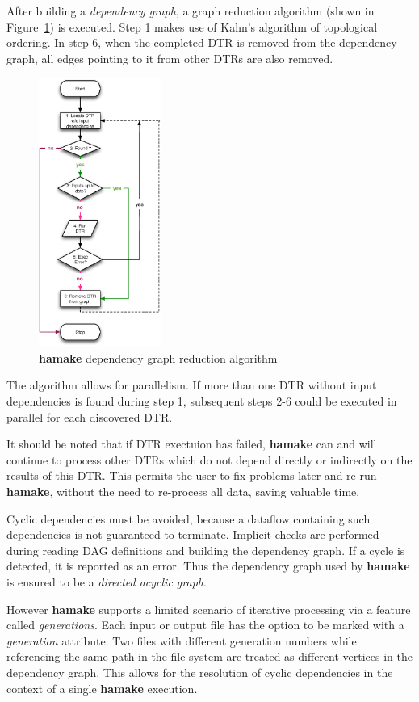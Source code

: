 \documentclass[10pt,conference,letterpaper]{IEEEtran}
\begin{document}
After building a \textit{dependency graph}, a graph reduction algorithm (shown in Figure~\ref{fig:grred}) is
executed. Step 1 makes use of Kahn's algorithm\cite{kahn1962topological} of
topological ordering. In step 6, when the completed DTR is
removed from the dependency graph, all edges pointing to it from other
DTRs are also removed.

\begin{figure}[htp]
\centering
\includegraphics[width=4cm]{GraphReduction.eps}
\caption{\textbf{hamake} dependency graph reduction algorithm}
\label{fig:grred}
\end{figure}

The algorithm allows for parallelism. If more than one DTR without
input dependencies is found during step 1, subsequent steps 2-6 could
be executed in parallel for each discovered DTR.

It should be noted that if DTR exectuion has failed, \textbf{hamake} can
and will continue to process other DTRs which do not depend directly or indirectly
on the results of this DTR. This permits the user to fix problems later and
re-run \textbf{hamake}, without the need to re-process all data, saving valuable time.

Cyclic dependencies must be avoided, because a dataflow containing
such dependencies is not guaranteed to terminate. Implicit checks are
performed during reading DAG definitions and building the dependency
graph. If a cycle is detected, it is reported as an error. Thus the
dependency graph used by \textbf{hamake} is ensured to be a
\textit{directed acyclic graph}.

However \textbf{hamake} supports a limited scenario of iterative
processing via a feature called \textit{generations}. Each input or
output file has the option to be marked with a \emph{generation}
attribute. Two files with different generation numbers while
referencing the same path in the file system are treated as different
vertices in the dependency graph. This allows for the resolution of cyclic dependencies
in the context of a single \textbf{hamake} execution.
\end{document}
